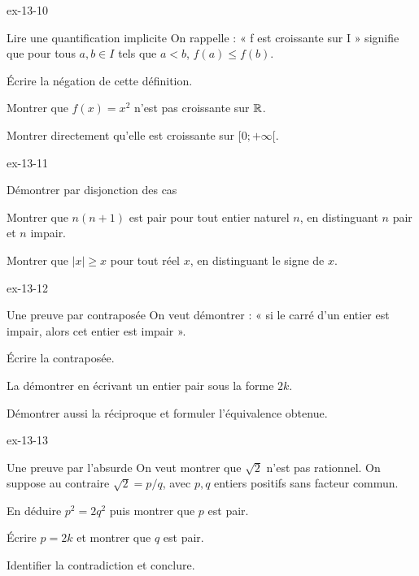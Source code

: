 \begin{blocLivre}{ex-13-10}
\begin{exercice}[2]{Lire une quantification implicite}
On rappelle : « f est croissante sur I » signifie que pour tous $a,b\in I$ tels que $a<b$, $f(a)\leq f(b)$.\begin{questions}
\item Écrire la négation de cette définition.
\item Montrer que $f(x)=x^2$ n’est pas croissante sur $\mathbb{R}$.
\item Montrer directement qu’elle est croissante sur $[0;+\infty[$.
\end{questions}
\end{exercice}
\end{blocLivre}
\begin{blocLivre}{ex-13-11}
\begin{exercice}[2]{Démontrer par disjonction des cas}
\begin{questions}
\item Montrer que $n(n+1)$ est pair pour tout entier naturel $n$, en distinguant $n$ pair et $n$ impair.
\item Montrer que $|x|\geq x$ pour tout réel $x$, en distinguant le signe de $x$.
\end{questions}
\end{exercice}
\end{blocLivre}
\clearpage
{}
\begin{blocLivre}{ex-13-12}
\begin{exercice}[3]{Une preuve par contraposée}
On veut démontrer : « si le carré d’un entier est impair, alors cet entier est impair ».\begin{questions}
\item Écrire la contraposée.
\item La démontrer en écrivant un entier pair sous la forme $2k$.
\item Démontrer aussi la réciproque et formuler l’équivalence obtenue.
\end{questions}
\end{exercice}
\end{blocLivre}
\begin{blocLivre}{ex-13-13}
\begin{exercice}[3]{Une preuve par l'absurde}
On veut montrer que $\sqrt2$ n’est pas rationnel. On suppose au contraire $\sqrt2=p/q$, avec $p,q$ entiers positifs sans facteur commun.\begin{questions}
\item En déduire $p^2=2q^2$ puis montrer que $p$ est pair.
\item Écrire $p=2k$ et montrer que $q$ est pair.
\item Identifier la contradiction et conclure.
\end{questions}
\end{exercice}
\end{blocLivre}
